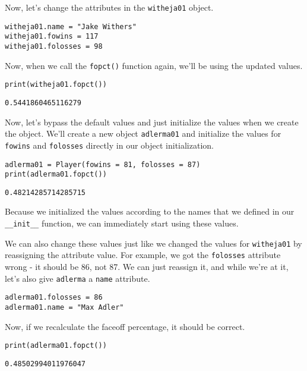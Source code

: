 Now, let's change the attributes in the \verb|witheja01| object.\par
\begin{lstlisting}[style=pippython]
witheja01.name = "Jake Withers"
witheja01.fowins = 117
witheja01.folosses = 98
\end{lstlisting}
Now, when we call the \verb|fopct()| function again, we'll be using the updated values.
\begin{lstlisting}[style=pippython]
print(witheja01.fopct())
\end{lstlisting}
\begin{lstlisting}[style=none]
0.5441860465116279
\end{lstlisting}
Now, let's bypass the default values and just initialize the values when we create the object. We'll create a new object \verb|adlerma01| and initialize the values for \verb|fowins| and \verb|folosses| directly in our object initialization.\par
\begin{lstlisting}[style=pippython]
adlerma01 = Player(fowins = 81, folosses = 87)
print(adlerma01.fopct())
\end{lstlisting}
\begin{lstlisting}[style=none]
0.48214285714285715
\end{lstlisting}
Because we initialized the values according to the names that we defined in our \verb|__init__| function, we can immediately start using these values.\par
We can also change these values just like we changed the values for \verb|witheja01| by reassigning the attribute value. For example, we got the \verb|folosses| attribute wrong - it should be 86, not 87. We can just reassign it, and while we're at it, let's also give \verb|adlerma| a \verb|name| attribute.\par
\begin{lstlisting}[style=pippython]
adlerma01.folosses = 86
adlerma01.name = "Max Adler"
\end{lstlisting}
Now, if we recalculate the faceoff percentage, it should be correct.\par
\begin{lstlisting}[style=pippython]
print(adlerma01.fopct())
\end{lstlisting}
\begin{lstlisting}[style=none]
0.48502994011976047
\end{lstlisting}
